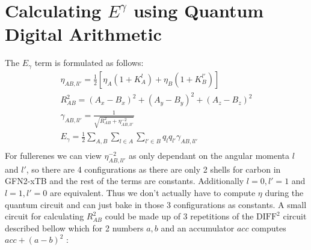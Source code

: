 \section{Calculating $E^\gamma$ using Quantum Digital Arithmetic}
The $E_\gamma$ term is formulated as follows:
\begin{gather}
    \eta_{AB,ll'} = \frac{1}{2}\left[\eta_A(1+K_A^l)+\eta_B(1+K_B^{l'})\right]\\
    R_{AB}^2 = (A_x-B_x)^2+(A_y-B_y)^2+(A_z-B_z)^2\\
    \gamma_{AB,ll'}=\frac{1}{\sqrt{R_{AB}^2+\eta_{AB,ll'}^{-2}}}\\
    E_\gamma=\frac{1}{2}\sum_{A,B}\sum_{l\in A}\sum_{l'\in B} q_lq_{l'}\gamma_{AB,ll'}\\
\end{gather}
For fullerenes we can view $\eta_{AB,ll'}^{-2}$ as only dependant on the angular momenta $l$ and $l'$, so there are 4 configurations as there are only 2 shells for carbon in GFN2-xTB and the rest of the terms are constants. Additionally $l=0,l'=1$ and $l=1,l'=0$ are equivalent. Thus we don't actually have to compute $\eta$ during the quantum circuit and can just bake in those 3 configurations as constants.  
A small circuit for calculating $R_{AB}^2$ could be made up of 3 repetitions of the $\text{DIFF}^2$ circuit described bellow which for 2 numbers $a,b$ and an accumulator $acc$ computes $acc + (a-b)^2$ :
